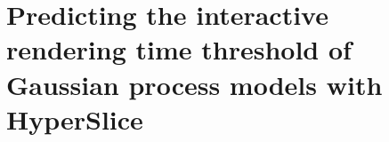 
\chapter{Predicting the interactive rendering time threshold of Gaussian process models with HyperSlice}











